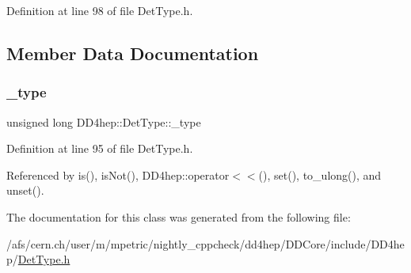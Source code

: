 Definition at line 98 of file Det\+Type.\+h.



\subsection{Member Data Documentation}
\hypertarget{class_d_d4hep_1_1_det_type_aa9653f5359e75679f73761809ed5923d}{}\label{class_d_d4hep_1_1_det_type_aa9653f5359e75679f73761809ed5923d} 
\subsubsection{\texorpdfstring{\+\_\+type}{\_type}}
{\footnotesize\ttfamily unsigned long D\+D4hep\+::\+Det\+Type\+::\+\_\+type\hspace{0.3cm}{\ttfamily [private]}}



Definition at line 95 of file Det\+Type.\+h.



Referenced by is(), is\+Not(), D\+D4hep\+::operator$<$$<$(), set(), to\+\_\+ulong(), and unset().



The documentation for this class was generated from the following file\+:\begin{DoxyCompactItemize}
\item 
/afs/cern.\+ch/user/m/mpetric/nightly\+\_\+cppcheck/dd4hep/\+D\+D\+Core/include/\+D\+D4hep/\hyperlink{_det_type_8h}{Det\+Type.\+h}\end{DoxyCompactItemize}
